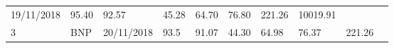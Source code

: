 \documentclass[
  11pt,
]{article}
\begin{document}
\begin{longtable}[]{@{}llllllllll@{}}
\begin{minipage}[t]{0.11\columnwidth}
19/11/2018\strut
\end{minipage} & \begin{minipage}[t]{0.07\columnwidth}\raggedright
95.40\strut
\end{minipage} & \begin{minipage}[t]{0.07\columnwidth}\raggedright
92.57\strut
\end{minipage} & \begin{minipage}[t]{0.07\columnwidth}\raggedright
45.28\strut
\end{minipage} & \begin{minipage}[t]{0.07\columnwidth}\raggedright
64.70\strut
\end{minipage} & \begin{minipage}[t]{0.07\columnwidth}\raggedright
76.80\strut
\end{minipage} & \begin{minipage}[t]{0.08\columnwidth}\raggedright
221.26\strut
\end{minipage} & \begin{minipage}[t]{0.09\columnwidth}\raggedright
10019.91\strut
\end{minipage}\tabularnewline
\begin{minipage}[t]{0.05\columnwidth}\raggedright
3\strut
\end{minipage} & \begin{minipage}[t]{0.07\columnwidth}\raggedright
BNP\strut
\end{minipage} & \begin{minipage}[t]{0.11\columnwidth}\raggedright
20/11/2018\strut
\end{minipage} & \begin{minipage}[t]{0.07\columnwidth}\raggedright
93.5\strut
\end{minipage} & \begin{minipage}[t]{0.07\columnwidth}\raggedright
91.07\strut
\end{minipage} & \begin{minipage}[t]{0.07\columnwidth}\raggedright
44.30\strut
\end{minipage} & \begin{minipage}[t]{0.07\columnwidth}\raggedright
64.98\strut
\end{minipage} & \begin{minipage}[t]{0.07\columnwidth}\raggedright
76.37\strut
\end{minipage} & \begin{minipage}[t]{0.08\columnwidth}\raggedright
221.26\strut
\end{minipage} & \begin{minipage}[t]{0.09\columnwidth}\raggedright

\end{minipage}
\end{longtable}
\end{document}
